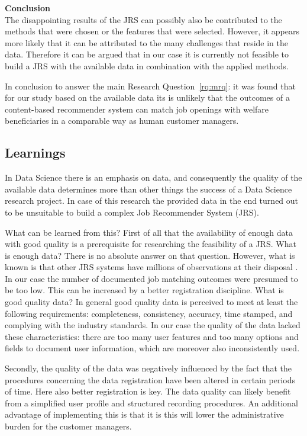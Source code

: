 \noindent
\textbf{Conclusion}\\
The disappointing results of the JRS can possibly also be contributed to the methods that were chosen or the features that were selected. 
However, it appears more likely that it can be attributed to the many challenges that reside in the data.
Therefore it can be argued that in our case it is currently not feasible to build a JRS with the available data in combination with the applied methods. 

In conclusion to answer the main Research Question~\ref{rq:mrq}: it was found that for our study based on the available data its is unlikely that the outcomes of a content-based recommender system can match job openings with welfare beneficiaries in a comparable way as human customer managers. 
\subsection{Learnings}
\label{ssec:learnings}

In Data Science there is an emphasis on data, and consequently the quality of the available data determines more than other things the success of a Data Science research project.
In case of this research the provided data in the end turned out to be unsuitable to build a complex Job Recommender System (JRS). 

What can be learned from this? 
First of all that the availability of enough data with good quality is a prerequisite for researching the feasibility of a JRS.
What is enough data?
There is no absolute answer on that question. 
However, what is known is that other JRS systems have millions of observations at their disposal \cite{kenthapadi2017personalized, T.Al-Otaibi2012ASystems, Zheng2012JobSurvey, hong2013job}.
In our case the number of documented job matching outcomes were presumed to be too low. 
This can be increased by a better registration discipline.
What is good quality data?
In general good quality data is perceived to meet at least the following requirements: completeness, consistency, accuracy, time stamped, and complying with the industry standards. 
In our case the quality of the data lacked these characteristics: there are too many user features and too many options and fields to document user information, which are moreover also inconsistently used. 

Secondly, the quality of the data was negatively influenced by the fact that the procedures concerning the data registration have been altered in certain periods of time.
Here also better registration is key.
The data quality can likely benefit from a simplified user profile and structured recording procedures. 
An additional advantage of implementing this is that it is this will lower the administrative burden for the customer managers.

